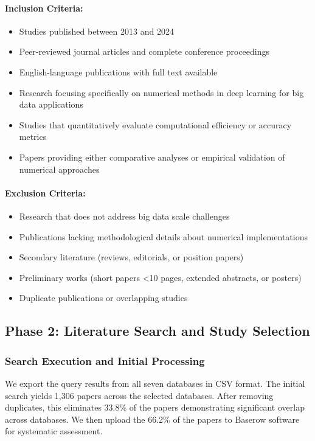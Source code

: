 \documentclass[acmsmall]{acmart}
\begin{document}
\noindent\paragraph{Inclusion Criteria:}
\begin{itemize}
    \item Studies published between 2013 and 2024
    \item Peer-reviewed journal articles and complete conference proceedings
    \item English-language publications with full text available
    \item Research focusing specifically on numerical methods in deep learning for big data applications
    \item Studies that quantitatively evaluate computational efficiency or accuracy metrics
    \item Papers providing either comparative analyses or empirical validation of numerical approaches
\end{itemize}

\noindent\paragraph{Exclusion Criteria:}
\begin{itemize}
    \item Research that does not address big data scale challenges
    \item Publications lacking methodological details about numerical implementations
    \item Secondary literature (reviews, editorials, or position papers)
    \item Preliminary works (short papers <10 pages, extended abstracts, or posters)
    \item Duplicate publications or overlapping studies
\end{itemize}


\subsection{Phase 2: Literature Search and Study Selection}\label{subsec:phase-2-literature-search-and-study-selection}
\subsubsection{Search Execution and Initial Processing}\label{subsubsec:phase-2-literature-search-and-study-selection:search-execution-and-initial-processing}
We export the query results from all seven databases in CSV format. The initial search yields 1,306 papers across the selected databases. After removing duplicates, this eliminates 33.8\% of the papers demonstrating significant overlap across databases. We then upload the 66.2\% of the papers to Baserow software for systematic assessment.
\end{document}

